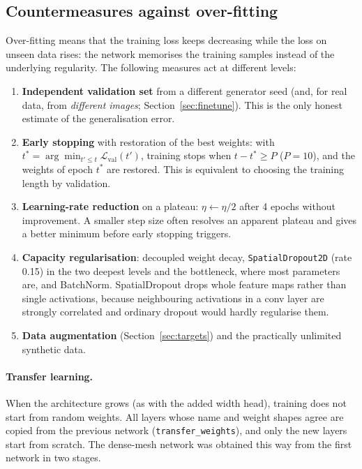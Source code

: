 \documentclass[11pt,a4paper]{article}
\newcommand{\code}[1]{\texttt{#1}}
\begin{document}
\subsection{Countermeasures against over-fitting}
Over-fitting means that the training loss keeps decreasing while the loss on unseen data rises: the network memorises the training samples instead of the underlying regularity. The following measures act at different levels:
\begin{enumerate}[leftmargin=*,itemsep=1pt]
\item \textbf{Independent validation set} from a different generator seed (and, for real data, from \emph{different images}; Section~\ref{sec:finetune}). This is the only honest estimate of the generalisation error.
\item \textbf{Early stopping} with restoration of the best weights: with $t^*=\arg\min_{t'\le t}\mathcal L_{\text{val}}(t')$, training stops when $t-t^*\ge P$ ($P=10$), and the weights of epoch $t^*$ are restored. This is equivalent to choosing the training length by validation.
\item \textbf{Learning-rate reduction} on a plateau: $\eta\leftarrow\eta/2$ after 4 epochs without improvement. A smaller step size often resolves an apparent plateau and gives a better minimum before early stopping triggers.
\item \textbf{Capacity regularisation}: decoupled weight decay, \code{SpatialDropout2D} (rate 0.15) in the two deepest levels and the bottleneck, where most parameters are, and BatchNorm. SpatialDropout drops whole feature maps rather than single activations, because neighbouring activations in a conv layer are strongly correlated and ordinary dropout would hardly regularise them.
\item \textbf{Data augmentation} (Section~\ref{sec:targets}) and the practically unlimited synthetic data.
\end{enumerate}

\paragraph{Transfer learning.} When the architecture grows (as with the added width head), training does not start from random weights. All layers whose name and weight shapes agree are copied from the previous network (\code{transfer\_weights}), and only the new layers start from scratch. The dense-mesh network was obtained this way from the first network in two stages.
\end{document}
